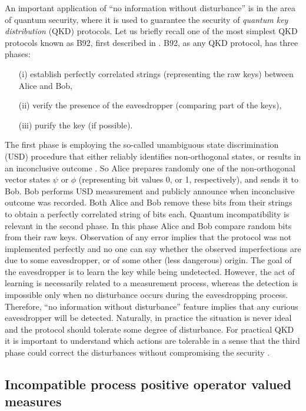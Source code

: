 \documentclass[12pt]{article}
\theoremstyle{definition}
\begin{document}
{An important application of ``no information without disturbance'' is in the area of quantum security, where it is used to guarantee the security of \emph{quantum key distribution} (QKD) protocols. 
Let us briefly recall one of the most simplest QKD protocols known as B92, first described in \cite{Bennett92}. 
B92, as any QKD protocol, has three phases: 
\begin{enumerate}
\item[(i)] establish perfectly correlated strings (representing the raw keys) 
between Alice and Bob, 
\item[(ii)] verify the presence of the eavesdropper (comparing part of the keys),
\item[(iii)] purify the key (if possible).
\end{enumerate}
The first phase is employing the
so-called unambiguous state discrimination (USD) procedure that either 
reliably identifies non-orthogonal states, or results in an inconclusive 
outcome \cite{Chefles00}. 
So Alice prepares randomly
one of the non-orthogonal vector states $\psi$ or $\phi$ (representing bit values 
0, or 1, respectively), and sends it to Bob. 
Bob performs USD measurement and publicly announce when inconclusive outcome was recorded. 
Both Alice and Bob remove these bits from their strings to
obtain a perfectly correlated string of bits each. 
Quantum incompatibility is relevant in the second phase. 
In this phase Alice and Bob compare random bits from their raw keys. 
Observation of any error implies that the protocol was not implemented 
perfectly and no one can say whether the observed imperfections are due 
to some eavesdropper, or of some other (less dangerous) origin. The goal
of the eavesdropper is to learn the key while being undetected. However,
the act of learning is necessarily related to a measurement process, whereas
the detection is impossible only when no disturbance occurs during the
eavesdropping process. Therefore, ``no information without disturbance'' 
feature implies that any curious eavesdropper will be detected. 
Naturally, in practice the situation is never ideal and the protocol should tolerate some degree of disturbance. 
For practical QKD it is important to understand which actions are tolerable in a sense that the third phase could correct the disturbances without compromising the security \cite{Renner08}. 



\subsection{Incompatible process positive operator valued measures}
\label{sec:ppovm}

}
\end{document}
